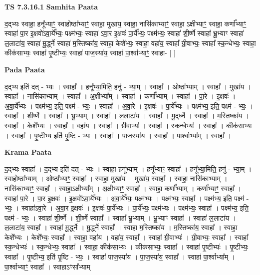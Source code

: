 \documentclass[17pt]{extarticle}
\begin{document}
\textbf{TS 7.3.16.1 } \newline
\textbf{Samhita Paata} \newline

द॒द्भ्यः स्वाहा॒ हनू᳚भ्याꣳ॒॒ स्वाहोष्ठा᳚भ्याꣳ॒॒ स्वाहा॒ मुखा॑य॒ स्वाहा॒ नासि॑काभ्याꣳ॒॒ स्वाहा॒ ऽक्षीभ्याꣳ॒॒ स्वाहा॒ कर्णा᳚भ्याꣳ॒॒ स्वाहा॑ पा॒र इ॒क्षवो॑ऽवा॒र्ये᳚भ्यः॒ पक्ष्म॑भ्यः॒ स्वाहा॑ ऽवा॒र इ॒क्षवः॑ पा॒र्ये᳚भ्यः॒ पक्ष्म॑भ्यः॒ स्वाहा॑ शी॒र्ष्णे स्वाहा᳚ भ्रू॒भ्याꣳ स्वाहा॑ ल॒लाटा॑य॒ स्वाहा॑ मू॒र्द्ध्ने स्वाहा॑ म॒स्तिष्का॑य॒ स्वाहा॒ केशे᳚भ्यः॒ स्वाहा॒ वहा॑य॒ स्वाहा᳚ ग्री॒वाभ्यः॒ स्वाहा᳚ स्क॒न्धेभ्यः॒ स्वाहा॒ कीक॑साभ्यः॒ स्वाहा॑ पृ॒ष्टीभ्यः॒ स्वाहा॑ पाज॒स्या॑य॒ स्वाहा॑ पा॒र्श्वाभ्याꣳ॒॒ स्वाहा- [  ] \newline

\textbf{Pada Paata} \newline

द॒द्भ्य इति॑ दत् - भ्यः । स्वाहा᳚ । हनू᳚भ्या॒मिति॒ हनु॑ - भ्या॒म् । स्वाहा᳚ । ओष्ठा᳚भ्याम् । स्वाहा᳚ । मुखा॑य । स्वाहा᳚ । नासि॑काभ्याम् । स्वाहा᳚ । अ॒क्षीभ्या᳚म् । स्वाहा᳚ । कर्णा᳚भ्याम् । स्वाहा᳚ । पा॒रे । इ॒क्षवः॑ । अ॒वा॒र्ये᳚भ्यः । पक्ष्म॑भ्य॒ इति॒ पक्ष्म॑ - भ्यः॒ । स्वाहा᳚ । अ॒वा॒रे । इ॒क्षवः॑ । पा॒र्ये᳚भ्यः । पक्ष्म॑भ्य॒ इति॒ पक्ष्म॑ - भ्यः॒ । स्वाहा᳚ । शी॒र्ष्णे । स्वाहा᳚ । भ्रू॒भ्याम् । स्वाहा᳚ । ल॒लाटा॑य । स्वाहा᳚ । मू॒द्‌र्ध्ने । स्वाहा᳚ । म॒स्तिष्का॑य । स्वाहा᳚ । केशे᳚भ्यः । स्वाहा᳚ । वहा॑य । स्वाहा᳚ । ग्री॒वाभ्यः॑ । स्वाहा᳚ । स्क॒न्धेभ्यः॑ । स्वाहा᳚ । कीक॑साभ्यः । स्वाहा᳚ । पृ॒ष्टीभ्य॒ इति॑ पृ॒ष्टि - भ्यः॒ । स्वाहा᳚ । पा॒ज॒स्या॑य । स्वाहा᳚ । पा॒र्श्वाभ्या᳚म् । स्वाहा᳚ ।  \newline


\textbf{Krama Paata} \newline

द॒द्भ्यः स्वाहा᳚ । द॒द्भ्य इति॑ दत् - भ्यः । स्वाहा॒ हनू᳚भ्याम् । हनू᳚भ्याꣳ॒॒ स्वाहा᳚ । हनू᳚भ्या॒मिति॒ हनु॑ - भ्या॒म् । स्वाहोष्ठा᳚भ्याम् । ओष्ठा᳚भ्याꣳ॒॒ स्वाहा᳚ । स्वाहा॒ मुखा॑य । मुखा॑य॒ स्वाहा᳚ । स्वाहा॒ नासि॑काभ्याम् । नासि॑काभ्याꣳ॒॒ स्वाहा᳚ । स्वाहा॒ऽक्षीभ्या᳚म् । अ॒क्षीभ्याꣳ॒॒ स्वाहा᳚ । स्वाहा॒ कर्णा᳚भ्याम् । कर्णा᳚भ्याꣳ॒॒ स्वाहा᳚ । स्वाहा॑ पा॒रे । पा॒र इ॒क्षवः॑ । इ॒क्षवो॑ऽवा॒र्ये᳚भ्यः । अ॒वा॒र्ये᳚भ्यः॒ पक्ष्म॑भ्यः । पक्ष्म॑भ्यः॒ स्वाहा᳚ । पक्ष्म॑भ्य॒ इति॒ पक्ष्म॑ - भ्यः॒ । स्वाहा॑ऽवा॒रे । अ॒वा॒र इ॒क्षवः॑ । इ॒क्षवः॑ पा॒र्ये᳚भ्यः । पा॒र्ये᳚भ्यः॒ पक्ष्म॑भ्यः । पक्ष्म॑भ्यः॒ स्वाहा᳚ । पक्ष्म॑भ्य॒ इति॒ पक्ष्म॑ - भ्यः॒ । स्वाहा॑ शी॒र्ष्णे । शी॒र्ष्णे स्वाहा᳚ । स्वाहा᳚ भ्रू॒भ्याम् । भ्रू॒भ्याꣳ स्वाहा᳚ । स्वाहा॑ ल॒लाटा॑य । ल॒लाटा॑य॒ स्वाहा᳚ । स्वाहा॑ मू॒र्द्ध्ने । मू॒र्द्ध्ने स्वाहा᳚ । स्वाहा॑ म॒स्तिष्का॑य । म॒स्तिष्का॑य॒ स्वाहा᳚ । स्वाहा॒ केशे᳚भ्यः । केशे᳚भ्यः॒ स्वाहा᳚ । स्वाहा॒ वहा॑य । वहा॑य॒ स्वाहा᳚ । स्वाहा᳚ ग्री॒वाभ्यः॑ । ग्री॒वाभ्यः॒ स्वाहा᳚ । स्वाहा᳚ स्क॒न्धेभ्यः॑ । स्क॒न्धेभ्यः॒ स्वाहा᳚ । स्वाहा॒ कीक॑साभ्यः । कीक॑साभ्यः॒ स्वाहा᳚ । स्वाहा॑ पृ॒ष्टीभ्यः॑ । पृ॒ष्टीभ्यः॒ स्वाहा᳚ । पृ॒ष्टीभ्य॒ इति॑ पृ॒ष्टि - भ्यः॒ । स्वाहा॑ पाज॒स्या॑य । पा॒ज॒स्या॑य॒ स्वाहा᳚ । स्वाहा॑ पा॒र्श्वाभ्या᳚म् । पा॒र्श्वाभ्याꣳ॒॒ स्वाहा᳚ । स्वाहाऽꣳसा᳚भ्याम् \newline
\end{document}
